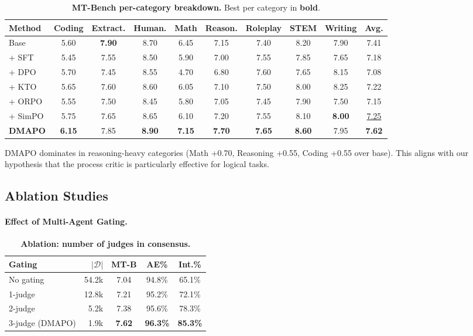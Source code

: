 \documentclass{article}
\newcommand{\ours}{\textsc{DMAPO}}
\newcommand{\best}[1]{\textbf{#1}}
\newcommand{\second}[1]{\underline{#1}}
\begin{document}
\begin{table}[t]
\centering
\caption{\textbf{MT-Bench per-category breakdown.} Best per category in \textbf{bold}.}
\label{tab:categories}
\vspace{0.3em}
\small
\begin{tabular}{l cccccccc c}
\toprule
\textbf{Method} & \textbf{Coding} & \textbf{Extract.} & \textbf{Human.} & \textbf{Math} & \textbf{Reason.} & \textbf{Roleplay} & \textbf{STEM} & \textbf{Writing} & \textbf{Avg.} \\
\midrule
Base            & 5.60 & \best{7.90} & 8.70 & 6.45 & 7.15 & 7.40 & 8.20 & 7.90 & 7.41 \\
+ SFT           & 5.45 & 7.55 & 8.50 & 5.90 & 7.00 & 7.55 & 7.85 & 7.65 & 7.18 \\
+ DPO           & 5.70 & 7.45 & 8.55 & 4.70 & 6.80 & 7.60 & 7.65 & 8.15 & 7.08 \\
+ KTO           & 5.65 & 7.60 & 8.60 & 6.05 & 7.10 & 7.50 & 8.00 & 8.25 & 7.22 \\
+ ORPO          & 5.55 & 7.50 & 8.45 & 5.80 & 7.05 & 7.45 & 7.90 & 7.50 & 7.15 \\
+ SimPO         & 5.75 & 7.65 & 8.65 & 6.10 & 7.20 & 7.55 & 8.10 & \best{8.00} & \second{7.25} \\
\midrule
\textbf{\ours{}} & \best{6.15} & 7.85 & \best{8.90} & \best{7.15} & \best{7.70} & \best{7.65} & \best{8.60} & 7.95 & \best{7.62} \\
\bottomrule
\end{tabular}
\end{table}

\ours{} dominates in reasoning-heavy categories (Math +0.70, Reasoning +0.55, Coding +0.55 over base).
This aligns with our hypothesis that the process critic is particularly effective for logical tasks.

\subsection{Ablation Studies}

\paragraph{Effect of Multi-Agent Gating.}

\begin{table}[t]
\centering
\caption{\textbf{Ablation: number of judges in consensus.}}
\label{tab:abl_judges}
\vspace{0.3em}
\small
\begin{tabular}{l r ccc}
\toprule
\textbf{Gating} & $|\mathcal{D}|$ & \textbf{MT-B} & \textbf{AE\%} & \textbf{Int.\%} \\
\midrule
No gating       & 54.2k & 7.04 & 94.8\% & 65.1\% \\
1-judge         & 12.8k & 7.21 & 95.2\% & 72.1\% \\
2-judge         & 5.2k  & 7.38 & 95.6\% & 78.3\% \\
3-judge (\ours) & 1.9k  & \best{7.62} & \best{96.3\%} & \best{85.3\%} \\
\bottomrule
\end{tabular}
\end{table}
\end{document}
